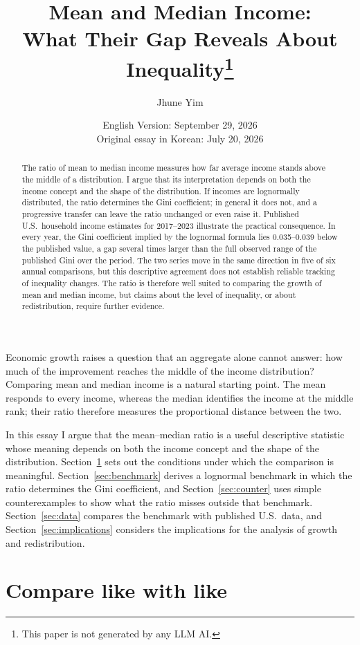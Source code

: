 \documentclass[11pt,a4paper]{article}
\title{Mean and Median Income:\\What Their Gap Reveals About
  Inequality\footnote{This paper is not generated by any LLM AI.}}
\author{Jhune Yim}
\date{English Version: September 29, 2026\\\small Original essay in Korean: July 20, 2026}
\begin{document}
\maketitle

\begin{abstract}
The ratio of mean to median income measures how far average income stands above the middle of a distribution. I argue that its interpretation depends on both the income concept and the shape of the distribution. If incomes are lognormally distributed, the ratio determines the Gini coefficient; in general it does not, and a progressive transfer can leave the ratio unchanged or even raise it. Published U.S.\ household income estimates for 2017--2023 illustrate the practical consequence. In every year, the Gini coefficient implied by the lognormal formula lies 0.035--0.039 below the published value, a gap several times larger than the full observed range of the published Gini over the period. The two series move in the same direction in five of six annual comparisons, but this descriptive agreement does not establish reliable tracking of inequality changes. The ratio is therefore well suited to comparing the growth of mean and median income, but claims about the level of inequality, or about redistribution, require further evidence.
\end{abstract}

Economic growth raises a question that an aggregate alone cannot answer: how much of the improvement reaches the middle of the income distribution? Comparing mean and median income is a natural starting point. The mean responds to every income, whereas the median identifies the income at the middle rank; their ratio therefore measures the proportional distance between the two.

In this essay I argue that the mean--median ratio is a useful descriptive statistic whose meaning depends on both the income concept and the shape of the distribution. Section~\ref{sec:concept} sets out the conditions under which the comparison is meaningful. Section~\ref{sec:benchmark} derives a lognormal benchmark in which the ratio determines the Gini coefficient, and Section~\ref{sec:counter} uses simple counterexamples to show what the ratio misses outside that benchmark. Section~\ref{sec:data} compares the benchmark with published U.S.\ data, and Section~\ref{sec:implications} considers the implications for the analysis of growth and redistribution.


\section{Compare like with like}
\label{sec:concept}
\end{document}
